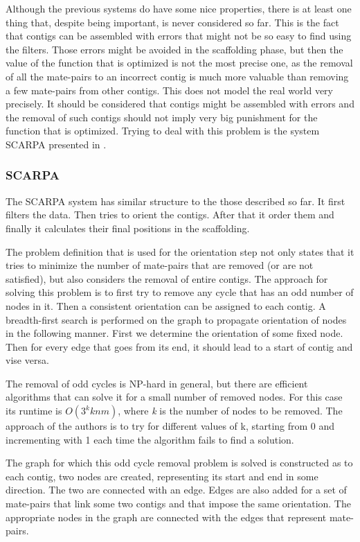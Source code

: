 \documentclass[11pt]{article}
\begin{document}
Although the previous systems do have some nice properties, there is at least
one thing that, despite being important, is never considered so far. This is the
fact that contigs can be assembled with errors that might not be so easy to find
using the filters. Those errors might be avoided in the scaffolding phase, but
then the value of the function that is optimized is not the most precise one, as
the removal of all the mate-pairs to an incorrect contig is much more valuable
than removing a few mate-pairs from other contigs. This does not model the real
world very precisely. It should be considered that contigs might be assembled
with errors and the removal of such contigs should not imply very big punishment
for the function that is optimized. Trying to deal with this problem is the
system SCARPA presented in \cite{SCARPA}.

\subsubsection{SCARPA} %
\label{ssub:SCARPA}
The SCARPA system has similar structure to the those described so far. It first
filters the data. Then tries to orient the contigs. After that it order them and
finally it calculates their final positions in the scaffolding.

The problem definition that is used for the orientation step not only states
that it tries to minimize the number of mate-pairs that are removed (or are not
satisfied), but also considers the removal of entire contigs. The approach for
solving this problem is to first try to remove any cycle that has an odd number
of nodes in it. Then a consistent orientation can be assigned to each
contig. A breadth-first search is performed on the graph to propagate
orientation of nodes in the following manner. First we determine the orientation
of some fixed node. Then for every edge that goes from its end, it should lead
to a start of contig and vise versa.

The removal of odd cycles is NP-hard in general, but there are efficient
algorithms that can solve it for a small number of removed nodes. For this case
its runtime is $O(3^k k n m )$, where \emph{k} is the number of nodes to be
removed. The approach of the authors is to try for different values of k,
starting from 0 and incrementing with 1 each time the algorithm fails to find a
solution.

The graph for which this odd cycle removal problem is solved is constructed as
to each contig, two nodes are created, representing its start and end in some
direction. The two are connected with an edge. Edges are also added for a set of
mate-pairs that link some two contigs and that impose the same orientation. The
appropriate nodes in the graph are connected with the edges that represent
mate-pairs.
\end{document}
